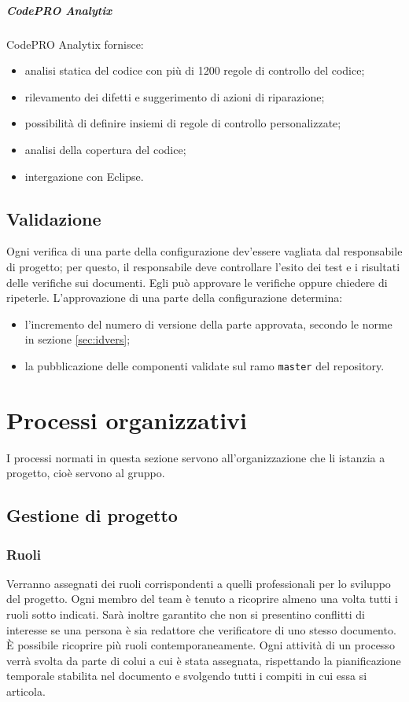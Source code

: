 		\subparagraph{CodePRO Analytix}
		CodePRO Analytix fornisce:
		\begin{itemize}
			\item analisi statica del codice con più di 1200 regole di controllo del codice;
			\item rilevamento dei difetti e suggerimento di azioni di riparazione;
			\item possibilità di definire insiemi di regole di controllo personalizzate;
			\item analisi della copertura del codice;
			\item intergazione con Eclipse.
		\end{itemize}


\subsection{Validazione}
Ogni verifica di una parte della configurazione dev'essere vagliata dal responsabile di progetto; per questo, il responsabile deve controllare l'esito dei test e i risultati delle verifiche sui documenti. Egli può approvare le verifiche oppure chiedere di ripeterle. L'approvazione di una parte della configurazione determina:
\begin{itemize}
	\item l'incremento del numero di versione della parte approvata, secondo le norme in sezione \ref{sec:idvers};
	\item la pubblicazione delle componenti validate sul ramo \texttt{master} del repository.
\end{itemize}





\section{Processi organizzativi} \label{sec:organizzativi}
I processi normati in questa sezione servono all'organizzazione che li istanzia a progetto, cioè servono al gruppo.


\subsection{Gestione di progetto}

\subsubsection{Ruoli} \label{sec:ruoli}
Verranno assegnati dei ruoli corrispondenti a quelli professionali per lo sviluppo del progetto. Ogni membro del team è tenuto a ricoprire almeno una volta tutti i ruoli sotto indicati. Sarà inoltre garantito che non si presentino conflitti di interesse se una persona è sia redattore che verificatore di uno stesso documento. È possibile ricoprire più ruoli contemporaneamente.
Ogni attività di un processo verrà svolta da parte di colui a cui è stata assegnata, rispettando la pianificazione temporale stabilita nel documento \PdP{} e svolgendo tutti i compiti in cui essa si articola.
